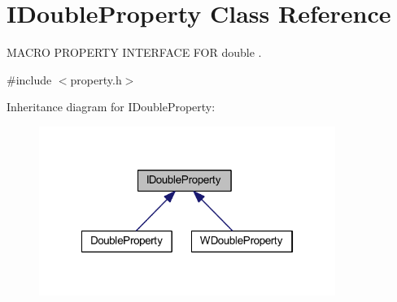 \hypertarget{class_i_double_property}{\section{I\-Double\-Property Class Reference}
\label{class_i_double_property}
}


M\-A\-C\-R\-O P\-R\-O\-P\-E\-R\-T\-Y I\-N\-T\-E\-R\-F\-A\-C\-E F\-O\-R double .  




{\ttfamily \#include $<$property.\-h$>$}



Inheritance diagram for I\-Double\-Property\-:
\nopagebreak
\begin{figure}[H]
\begin{center}
\leavevmode
\includegraphics[width=273pt]{class_i_double_property__inherit__graph}
\end{center}
\end{figure}
